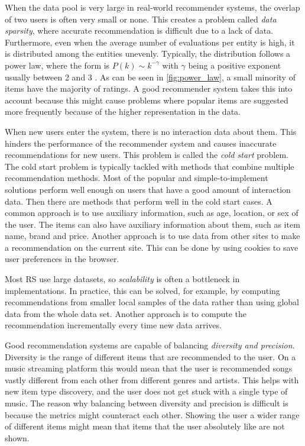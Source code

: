\documentclass[english, 12pt, a4paper, sci, utf8, a-2b, online]{aaltothesis}
\begin{document}
When the data pool is very large in real-world recommender systems, the overlap of two users is often very small or none. This creates a problem called \textit{data sparsity}, where accurate recommendation is difficult due to a lack of data. Furthermore, even when the average number of evaluations per entity is high, it is distributed among the entities unevenly. Typically, the distribution follows a power law, where the form is $P(k) \sim k^{-\gamma}$ with $\gamma$ being a positive exponent usually between 2 and 3 \parencite{RevModPhys.74.47}. As can be seen in \autoref{fig:power_law}, a small minority of items have the majority of ratings. A good recommender system takes this into account because this might cause problems where popular items are suggested more frequently because of the higher representation in the data. 

When new users enter the system, there is no interaction data about them. This hinders the performance of the recommender system and causes inaccurate recommendations for new users. This problem is called the \textit{cold start} problem. The cold start problem is typically tackled with methods that combine multiple recommendation methods. Most of the popular and simple-to-implement solutions perform well enough on users that have a good amount of interaction data. Then there are methods that perform well in the cold start cases. A common approach is to use auxiliary information, such as age, location, or sex of the user. The items can also have auxiliary information about them, such as item name, brand and price.  Another approach is to use data from other sites to make a recommendation on the current site. This can be done by using cookies to save user preferences in the browser.

Most RS use large datasets, so \textit{scalability} is often a bottleneck in implementations. In practice, this can be solved, for example, by computing recommendations from smaller local samples of the data rather than using global data from the whole data set. Another approach is to compute the recommendation incrementally every time new data arrives.

Good recommendation systems are capable of balancing \textit{diversity and precision}. Diversity is the range of different items that are recommended to the user. On a music streaming platform this would mean that the user is recommended songs vastly different from each other from different genres and artists. This helps with new item type discovery, and the user does not get stuck with a single type of music. The reason why balancing between diversity and precision is difficult is because the metrics might counteract each other. Showing the user a wider range of different items might mean that items that the user absolutely like are not shown. 
\end{document}
